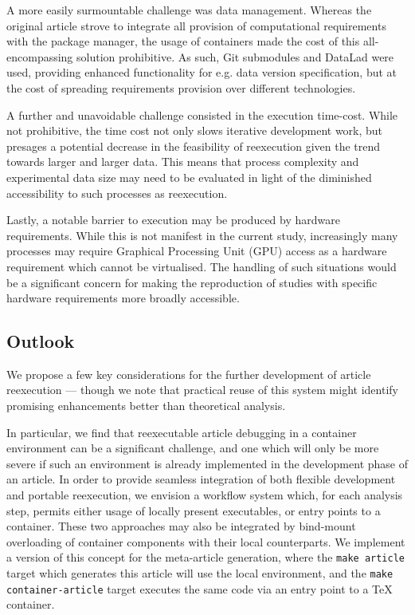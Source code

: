 A more easily surmountable challenge was data management.
Whereas the original article strove to integrate all provision of computational requirements with the package manager, the usage of containers made the cost of this all-encompassing solution prohibitive.
As such, Git submodules and DataLad were used, providing enhanced functionality for e.g. data version specification, but at the cost of spreading requirements provision over different technologies.

A further and unavoidable challenge consisted in the execution time-cost.
While not prohibitive, the time cost not only slows iterative development work, but presages a potential decrease in the feasibility of reexecution given the trend towards larger and larger data.
This means that process complexity and experimental data size may need to be evaluated in light of the diminished accessibility to such processes as reexecution.

Lastly, a notable barrier to execution may be produced by hardware requirements.
While this is not manifest in the current study, increasingly many processes may require Graphical Processing Unit (GPU) access as a hardware requirement which cannot be virtualised.
The handling of such situations would be a significant concern for making the reproduction of studies with specific hardware requirements more broadly accessible. 

\subsection{Outlook}

We propose a few key considerations for the further development of article reexecution — though we note that practical reuse of this system might identify promising enhancements better than theoretical analysis.

In particular, we find that reexecutable article debugging in a container environment can be a significant challenge, and one which will only be more severe if such an environment is already implemented in the development phase of an article.
In order to provide seamless integration of both flexible development and portable reexecution, we envision a workflow system which, for each analysis step, permits either usage of locally present executables, or entry points to a container.
These two approaches may also be integrated by bind-mount overloading of container components with their local counterparts.
We implement a version of this concept for the meta-article generation, where the \texttt{make article} target which generates this article will use the local environment, and the \texttt{make container-article} target executes the same code via an entry point to a \TeX{} container.

